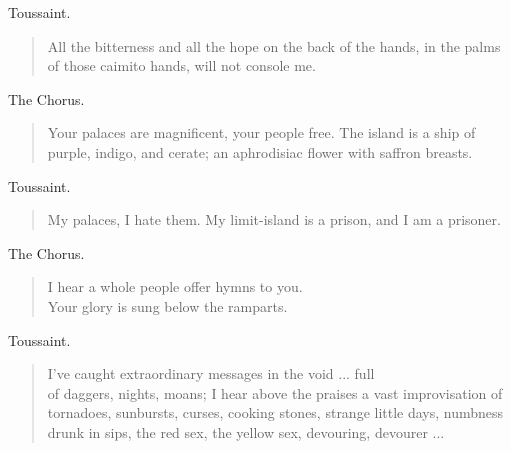 \documentclass[letterpaper,article,12pt,oneside,notitlepage]{memoir}
\begin{document}
\begin{center}Toussaint.\end{center}

\begin{verse}
\indent All the bitterness and all the hope on the back of the hands, in the palms of those caimito hands, will not console me. \\
\end{verse}

\begin{center}The Chorus.\end{center}

\begin{verse}
\indent Your palaces are magnificent, your people free. The island is a ship of purple, indigo, and cerate; an aphrodisiac flower with saffron breasts. \\
\end{verse}

\begin{center}Toussaint.\end{center}

\begin{verse}
\indent My palaces, I hate them. My limit-island is a prison, and I am a prisoner. \\
\end{verse}

\begin{center}The Chorus.\end{center}

\begin{verse}
\hspace{1cm} I hear a whole people offer hymns to you. \\
\hspace{1cm} Your glory is sung below the ramparts. \\
\end{verse}

\begin{center}Toussaint.\end{center}

\begin{verse}
I've caught extraordinary messages in the void ... full \\
of daggers, nights, moans; I hear above the praises a vast improvisation of tornadoes, sunbursts, curses, cooking stones, strange little days, numbness drunk in sips, the red sex, the yellow sex, devouring, devourer ... \\
\end{verse}
\end{document}
